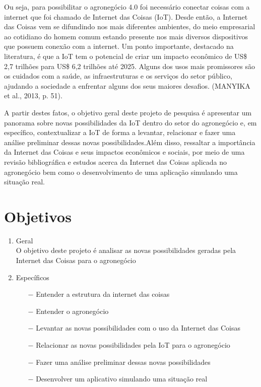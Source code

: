 \documentclass[eso]{bcc}
\begin{document}
Ou seja, para possibilitar o agronegócio 4.0 foi necessário conectar coisas com a internet que 
foi chamado de Internet das Coisas (IoT). Desde então, a Internet das Coisas vem se difundindo 
nos mais diferentes ambientes, do meio empresarial ao cotidiano do homem comum estando presente 
nos mais diversos dispositivos que possuem conexão com a internet. Um ponto importante, 
destacado na literatura, é que a IoT tem o potencial de criar um impacto econômico de 
US\$ 2,7 trilhões para US\$ 6,2 trilhões até 2025. Alguns dos usos mais promissores são os 
cuidados com a saúde, as infraestruturas e os serviços do setor público, ajudando a sociedade 
a enfrentar alguns dos seus maiores desafios. (MANYIKA et al., 2013, p. 51).

A partir destes fatos, o objetivo geral deste projeto de pesquisa é apresentar um panorama 
sobre novas possibilidades da IoT dentro do setor do agronegócio e, em específico, 
contextualizar a IoT de forma a levantar, relacionar e fazer uma análise preliminar dessas 
novas possibilidades.Além disso, ressaltar  a  importância  da Internet das Coisas e seus 
impactos econômicos e sociais,  por meio de uma revisão bibliográfica e estudos acerca da 
Internet das Coisas aplicada no agronegócio bem como o desenvolvimento de uma aplicação 
simulando uma situação real.


\section{Objetivos}

\begin{enumerate}
    \item Geral\\
    O objetivo deste projeto é analisar as novas possibilidades geradas pela Internet das Coisas para o agronegócio
    \item Específicos
    \begin{enumerate}
        \item[$-$]  Entender a estrutura da internet das coisas
        \item[$-$] Entender o agronegócio
        \item[$-$] Levantar as novas possibilidades com o uso da Internet das Coisas
        \item[$-$] Relacionar as novas possibilidades pela IoT para o agronegócio 
        \item[$-$] Fazer uma análise preliminar dessas novas possibilidades
        \item[$-$] Desenvolver um aplicativo simulando uma situação real
    \end{enumerate}
\end{enumerate}
\end{document}

